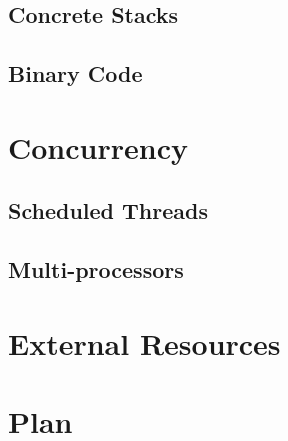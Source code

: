 \documentclass{article}
\begin{document}
\subsection{Concrete Stacks}
\subsection{Binary Code}

\section{Concurrency}
\subsection{Scheduled Threads}
\subsection{Multi-processors}

\section{External Resources}

\section{Plan}
\end{document}

